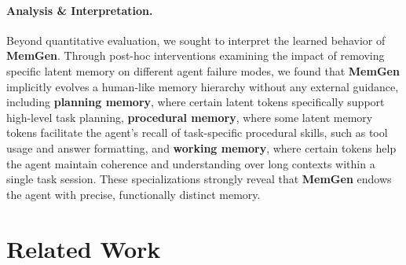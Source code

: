 \documentclass[]{fairmeta}
\newcommand{\ourmethod}{{\fontfamily{lmtt}\selectfont \textbf{MemGen}}\xspace}
\begin{document}
\vspace{-0.8em}
\paragraph{Analysis \& Interpretation.} Beyond quantitative evaluation, we sought to interpret the learned behavior of \ourmethod. Through post-hoc interventions examining the impact of removing specific latent memory on different agent failure modes, we found that \ourmethod implicitly evolves a human-like memory hierarchy without any external guidance, including \textbf{ planning memory}, where certain latent tokens specifically support high-level task planning, \textbf{ procedural memory}, where some latent memory tokens facilitate the agent’s recall of task-specific procedural skills, such as tool usage and answer formatting, and \textbf{ working memory}, where certain tokens help the agent maintain coherence and understanding over long contexts within a single task session. These specializations strongly reveal that \ourmethod endows the agent with precise, functionally distinct memory.





\section{Related Work}
\vspace{-0.6em}
\end{document}
